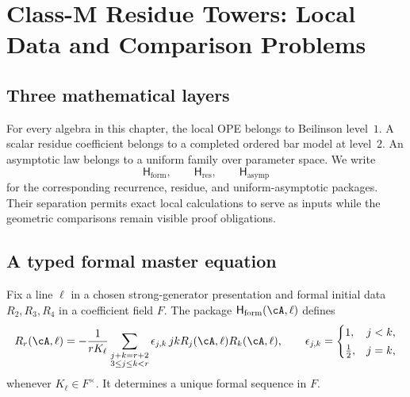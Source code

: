 
\providecommand{\Vir}{\mathrm{Vir}}
\providecommand{\cW}{\mathcal W}
\providecommand{\ClaimStatusProvedHere}{}
\providecommand{\ClaimStatusConditional}{}
\providecommand{\ClaimStatusDefinitional}{}
\providecommand{\ClaimStatusOpen}{}

\chapter{Class-M Residue Towers: Local Data and Comparison Problems}
\label{chap:shadow-tower-other-class-m-platonic}

\section*{Three mathematical layers}

For every algebra in this chapter, the local OPE belongs to
Beilinson level~\(1\).  A scalar residue coefficient belongs to a
completed ordered bar model at level~\(2\).  An asymptotic law belongs
to a uniform family over parameter space.  We write
\[
 \mathsf H_{\mathrm{form}},\qquad
 \mathsf H_{\mathrm{res}},\qquad
 \mathsf H_{\mathrm{asymp}}
\]
for the corresponding recurrence, residue, and uniform-asymptotic
packages.  Their separation permits exact local calculations to serve
as inputs while the geometric comparisons remain visible proof
obligations.

\section{A typed formal master equation}
\label{sec:class-m-master-equation}

\begin{proposition}
\label{prop:shadow-tower-master-equation-classM}
\ClaimStatusProvedHere
Fix a line \(\ell\) in a chosen strong-generator presentation and
formal initial data \(R_2,R_3,R_4\) in a coefficient field \(F\).
The package \(\mathsf H_{\mathrm{form}}(\cA,\ell)\) defines
\begin{equation}
 R_r(\cA,\ell)=
 -\frac{1}{rK_\ell}
 \sum_{\substack{j+k=r+2\\3\le j\le k<r}}
 \epsilon_{j,k}\,jkR_j(\cA,\ell)R_k(\cA,\ell),
 \qquad
 \epsilon_{j,k}=\begin{cases}1,&j<k,\\[2pt]\frac12,&j=k,
 \end{cases}
 \label{eq:master-eqn-classM}
\end{equation}
whenever \(K_\ell\in F^\times\).  It determines a unique formal
sequence in \(F\).
\end{proposition}

